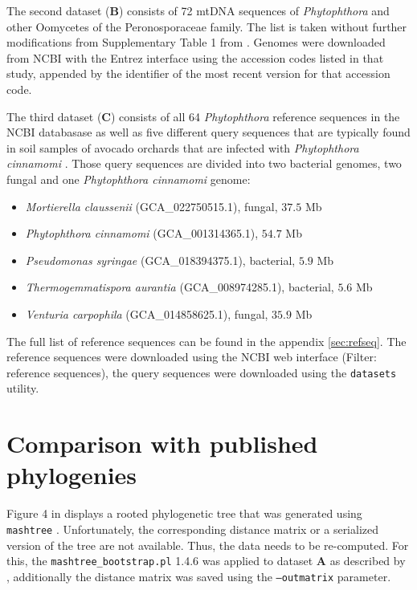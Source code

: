 The second dataset (\textbf{B}) consists of 72 mtDNA sequences of
\textit{Phytophthora}
and other Oomycetes of the Peronosporaceae family. The list is taken without
further modifications from Supplementary Table 1 from
\cite{winkworthComparativeAnalysesComplete2022}. Genomes were downloaded from
NCBI with the Entrez interface \cite{sayersDatabaseResourcesNational2022} using
the accession codes listed in that study, appended by the identifier of the most
recent version for that accession code.

The third dataset (\textbf{C}) consists of all 64 \textit{Phytophthora}
reference sequences in the NCBI databasase as well as five different query
sequences that are typically found in soil samples of avocado orchards that are
infected with \textit{Phytophthora cinnamomi}
\cite{solis-garciaPhytophthoraRootRot2020}. Those query sequences are divided
into two bacterial genomes, two fungal and one \textit{Phytophthora cinnamomi}
genome:

\begin{itemize}
  \item \textit{Mortierella claussenii} (GCA\_022750515.1), fungal, $37.5$ Mb
  \item \textit{Phytophthora cinnamomi} (GCA\_001314365.1), $54.7$ Mb  
  \item \textit{Pseudomonas syringae} (GCA\_018394375.1), bacterial, $5.9$ Mb
  \item \textit{Thermogemmatispora aurantia} (GCA\_008974285.1), bacterial, $5.6$ Mb
  \item \textit{Venturia carpophila} (GCA\_014858625.1), fungal, $35.9$ Mb
\end{itemize}

The full list of reference sequences can be found in the appendix
\ref{sec:refseq}. The reference sequences were downloaded using the NCBI web
interface (Filter: reference sequences), the query sequences were downloaded
using the \texttt{datasets} \cite{sayersDatabaseResourcesNational2022} utility.



\section{Comparison with published phylogenies}
Figure 4 in \cite{mandalComparativeGenomeAnalysis2022} displays a rooted
phylogenetic tree that was generated using \texttt{mashtree}
\cite{katzMashtreeRapidComparison2019,ondovMashFastGenome2016}. Unfortunately,
the corresponding distance matrix or a serialized version of the tree are not
available. Thus, the data needs to be re-computed. For this, the
\texttt{mashtree\_bootstrap.pl} 1.4.6 was applied to dataset \textbf{A} as
described by
\cite{mandalComparativeGenomeAnalysis2022}, additionally the distance matrix was
saved using the \texttt{--outmatrix} parameter.


